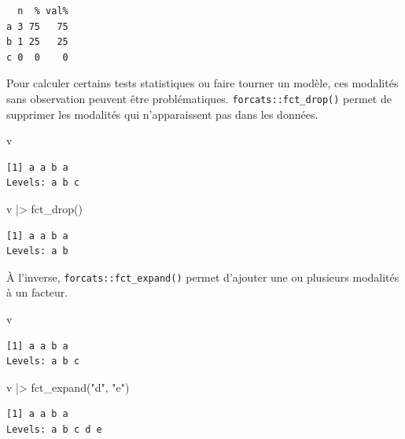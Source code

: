 \documentclass[
  letterpaper,
  DIV=11,
  numbers=noendperiod,
  oneside]{scrreprt}
\newenvironment{Shaded}{\begin{snugshade}}{\end{snugshade}}
\newcommand{\FunctionTok}[1]{\textcolor[rgb]{0.28,0.35,0.67}{#1}}
\newcommand{\NormalTok}[1]{\textcolor[rgb]{0.00,0.23,0.31}{#1}}
\newcommand{\SpecialCharTok}[1]{\textcolor[rgb]{0.37,0.37,0.37}{#1}}
\newcommand{\StringTok}[1]{\textcolor[rgb]{0.13,0.47,0.30}{#1}}
\begin{document}
\begin{verbatim}
  n  % val%
a 3 75   75
b 1 25   25
c 0  0    0
\end{verbatim}

Pour calculer certains tests statistiques ou faire tourner un modèle,
ces modalités sans observation peuvent être problématiques.
\texttt{forcats::fct\_drop()} permet de supprimer les modalités qui
n'apparaissent pas dans les données.

\begin{Shaded}
\begin{Highlighting}[]
\NormalTok{v}
\end{Highlighting}
\end{Shaded}

\begin{verbatim}
[1] a a b a
Levels: a b c
\end{verbatim}

\begin{Shaded}
\begin{Highlighting}[]
\NormalTok{v }\SpecialCharTok{|\textgreater{}} \FunctionTok{fct\_drop}\NormalTok{()}
\end{Highlighting}
\end{Shaded}

\begin{verbatim}
[1] a a b a
Levels: a b
\end{verbatim}

À l'inverse, \texttt{forcats::fct\_expand()} permet d'ajouter une ou
plusieurs modalités à un facteur.

\begin{Shaded}
\begin{Highlighting}[]
\NormalTok{v}
\end{Highlighting}
\end{Shaded}

\begin{verbatim}
[1] a a b a
Levels: a b c
\end{verbatim}

\begin{Shaded}
\begin{Highlighting}[]
\NormalTok{v }\SpecialCharTok{|\textgreater{}} \FunctionTok{fct\_expand}\NormalTok{(}\StringTok{"d"}\NormalTok{, }\StringTok{"e"}\NormalTok{)}
\end{Highlighting}
\end{Shaded}

\begin{verbatim}
[1] a a b a
Levels: a b c d e
\end{verbatim}
\end{document}
